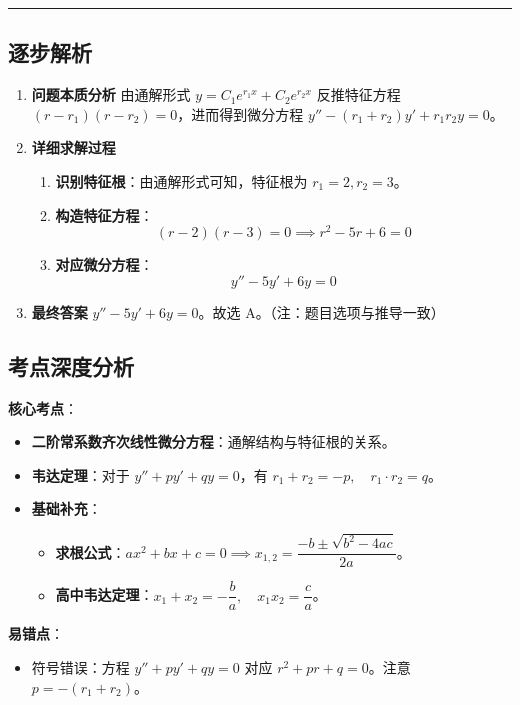 \documentclass[UTF8,10pt]{ctexart}
\newenvironment{redenv}{\color{red}}{}
\newenvironment{detailedanalysis}{%
    \color{red}
    \begin{enumerate}[label=\textbf{第\arabic*步：}, leftmargin=*, align=left, itemsep=0pt, parsep=0pt, topsep=0pt, partopsep=0pt]
}{%
    \end{enumerate}
}
\newenvironment{conceptbox}{%
    \begin{tcolorbox}[colback=red!5, colframe=red!50!black, title=概念解析, fonttitle=\bfseries, top=2pt, bottom=2pt, left=2pt, right=2pt]
}{%
    \end{tcolorbox}
}
\newcommand{\analysisrule}{\noindent\rule{\textwidth}{0.8pt}\vspace{-0.5em}}
\begin{document}
\begin{redenv}
\analysisrule
\subsection*{逐步解析}

\begin{detailedanalysis}
\item \textbf{问题本质分析}
由通解形式 $y = C_1 e^{r_1 x} + C_2 e^{r_2 x}$ 反推特征方程 $(r-r_1)(r-r_2)=0$，进而得到微分方程 $y'' - (r_1+r_2)y' + r_1r_2 y = 0$。

\item \textbf{详细求解过程}
\begin{enumerate}[label=(\alph*)]
    \item \textbf{识别特征根}：由通解形式可知，特征根为 $r_1=2, r_2=3$。
    \item \textbf{构造特征方程}：
    \[ (r-2)(r-3) = 0 \implies r^2 - 5r + 6 = 0 \]
    \item \textbf{对应微分方程}：
    \[ y'' - 5y' + 6y = 0 \]
\end{enumerate}

\item \textbf{最终答案}
$y'' - 5y' + 6y = 0$。故选 A。（注：题目选项与推导一致）
\end{detailedanalysis}

\subsection*{考点深度分析}
\begin{conceptbox}
\textbf{核心考点}：
\begin{itemize}
    \item \textbf{二阶常系数齐次线性微分方程}：通解结构与特征根的关系。
    \item \textbf{韦达定理}：对于 $y''+py'+qy=0$，有 $r_1+r_2 = -p, \quad r_1 \cdot r_2 = q$。
    \item \textbf{基础补充}：
    \begin{itemize}
        \item \textbf{求根公式}：$ax^2+bx+c=0 \implies x_{1,2} = \dfrac{-b \pm \sqrt{b^2-4ac}}{2a}$。
        \item \textbf{高中韦达定理}：$x_1+x_2 = -\dfrac{b}{a}, \quad x_1 x_2 = \dfrac{c}{a}$。
    \end{itemize}
\end{itemize}
\textbf{易错点}：
\begin{itemize}
    \item 符号错误：方程 $y''+py'+qy=0$ 对应 $r^2+pr+q=0$。注意 $p = -(r_1+r_2)$。
\end{itemize}
\end{conceptbox}
\end{redenv}
\end{document}
